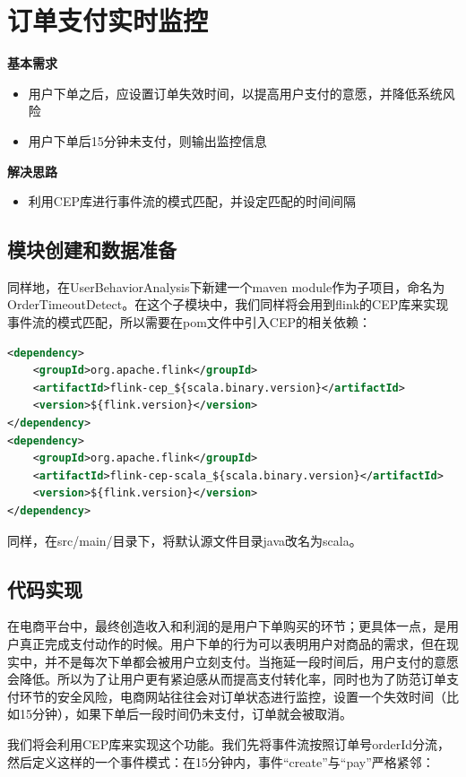 \documentclass[oneside]{ctexbook}
\begin{document}
\section{订单支付实时监控}

\textbf{基本需求}
\begin{itemize}
\item 用户下单之后，应设置订单失效时间，以提高用户支付的意愿，并降低系统风险
\item 用户下单后15分钟未支付，则输出监控信息
\end{itemize}
\textbf{解决思路}
\begin{itemize}
\item 利用CEP库进行事件流的模式匹配，并设定匹配的时间间隔
\end{itemize}

\subsection{模块创建和数据准备}

同样地，在UserBehaviorAnalysis下新建一个maven module作为子项目，命名为OrderTimeoutDetect。在这个子模块中，我们同样将会用到flink的CEP库来实现事件流的模式匹配，所以需要在pom文件中引入CEP的相关依赖：

\begin{lstlisting}[language=xml]
<dependency>
    <groupId>org.apache.flink</groupId>
    <artifactId>flink-cep_${scala.binary.version}</artifactId>
    <version>${flink.version}</version>
</dependency>
<dependency>
    <groupId>org.apache.flink</groupId>
    <artifactId>flink-cep-scala_${scala.binary.version}</artifactId>
    <version>${flink.version}</version>
</dependency>
\end{lstlisting}

同样，在src/main/目录下，将默认源文件目录java改名为scala。

\subsection{代码实现}

在电商平台中，最终创造收入和利润的是用户下单购买的环节；更具体一点，是用户真正完成支付动作的时候。用户下单的行为可以表明用户对商品的需求，但在现实中，并不是每次下单都会被用户立刻支付。当拖延一段时间后，用户支付的意愿会降低。所以为了让用户更有紧迫感从而提高支付转化率，同时也为了防范订单支付环节的安全风险，电商网站往往会对订单状态进行监控，设置一个失效时间（比如15分钟），如果下单后一段时间仍未支付，订单就会被取消。

我们将会利用CEP库来实现这个功能。我们先将事件流按照订单号orderId分流，然后定义这样的一个事件模式：在15分钟内，事件“create”与“pay”严格紧邻：
\end{document}
